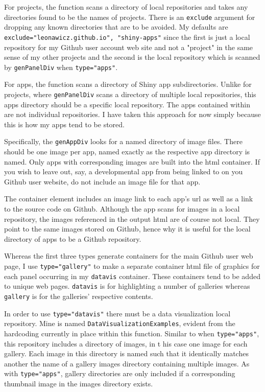 \documentclass{article}\usepackage[]{graphicx}\usepackage[]{color}
\begin{document}

For projects, the function scans a directory of local repositories and takes any directories found to be the names of projects.
There is an \texttt{exclude} argument for dropping any known directories that are to be avoided.
My defaults are \texttt{exclude="leonawicz.github.io", "shiny-apps"} since the first is just a local repository for my Github user account web site and not a "project" in the same sense of my other projects
and the second is the local repository which is scanned by \texttt{genPanelDiv} when \texttt{type="apps"}.


For apps, the function scans a directory of Shiny app subdirectories.
Unlike for projects, where \texttt{genPanelDiv} scans a directory of multiple local repositories, this apps directory should be a specific local repository. The apps contained within are not individual repositories.
I have taken this approach for now simply because this is how my apps tend to be stored.

Specifically, the \texttt{genAppDiv} looks for a named directory of image files.
There should be one image per app, named exactly as the respective app directory is named.
Only apps with corresponding images are built into the html container.
If you wish to leave out, say, a developmental app from being linked to on you Github user website, do not include an image file for that app.

The container element includes an image link to each app's url as well as a link to the source code on Github.
Although the app scans for images in a local repository, the images referenced in the output html are of course not local.
They point to the same images stored on Github, hence why it is useful for the local directory of apps to be a Github repository.


Whereas the first three types generate containers for the main Github user web page, I use \texttt{type="gallery"} to make a separate container html file of graphics for each panel occurring in my \texttt{datavis} container.
These containers tend to be added to unique web pages.
\texttt{datavis} is for highlighting a number of galleries whereas \texttt{gallery} is for the galleries' respective contents.

In order to use \texttt{type="datavis"} there must be a data visualization local repository.
Mine is named \texttt{DataVisualizationExamples}, evident from the hardcoding currently in place within this function.
Similar to when \texttt{type="apps"}, this repository includes a directory of images, in t his case one image for each gallery.
Each image in this directory is named such that it identically matches another the name of a gallery images directory containing multiple images.
As with \texttt{type="apps"}, gallery directories are only included if a corresponding thumbnail image in the images directory exists.
\end{document}

